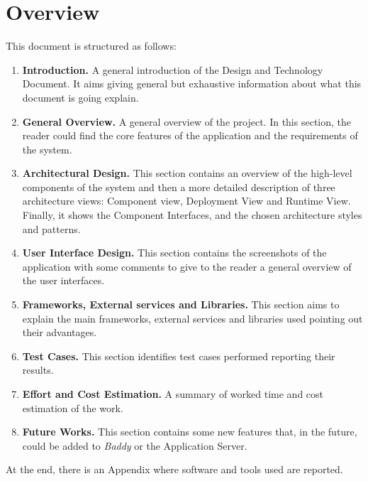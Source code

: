 \documentclass[../../dd.tex]{subfiles}
\begin{document}
    \section{Overview}
    This document is structured as follows:
    \begin{enumerate}
        \item \textbf{Introduction.} A general introduction of the Design and Technology Document.
        It aims giving general but exhaustive information
        about what this document is going explain.
        \item \textbf{General Overview.} A general overview of the project.
        In this section, the reader could find the core features of the application and
        the requirements of the system.
        \item \textbf{Architectural Design.} This section contains an overview
        of the high-level components of the system and then a more detailed
        description of three architecture views: Component view, Deployment
        View and Runtime View.
        Finally, it shows the Component Interfaces, and the chosen architecture styles and patterns.
        \item \textbf{User Interface Design.} This section contains the screenshots
        of the application with some comments to give to the reader a general
        overview of the user interfaces.
        \item \textbf{Frameworks, External services and Libraries.} This section
        aims to explain the main frameworks, external services and libraries
        used pointing out their advantages.
        \item \textbf{Test Cases.} This section identifies test cases performed reporting
        their results.
        \item \textbf{Effort and Cost Estimation.} A summary of worked time and
        cost estimation of the work.
        \item \textbf{Future Works.} This section contains some new features that,
        in the future, could be added to \textit{Baddy} or the Application Server.
    \end{enumerate}

    At the end, there is an Appendix where software and tools used are reported.
\end{document}

